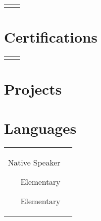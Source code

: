 \documentclass[11pt, letterpaper]{resume}
\begin{document}
\begin{paracol}{2}
\begin{supertabular}{rl}

\end{supertabular}


\section*{Certifications}
\begin{supertabular}{rl}


\end{supertabular}

\bigskip


\section*{Projects}




\section*{Languages}

\begin{supertabular}{rl}

{Native Speaker}

{Elementary}

{Elementary}

\end{supertabular}

\end{paracol}
\end{document}
